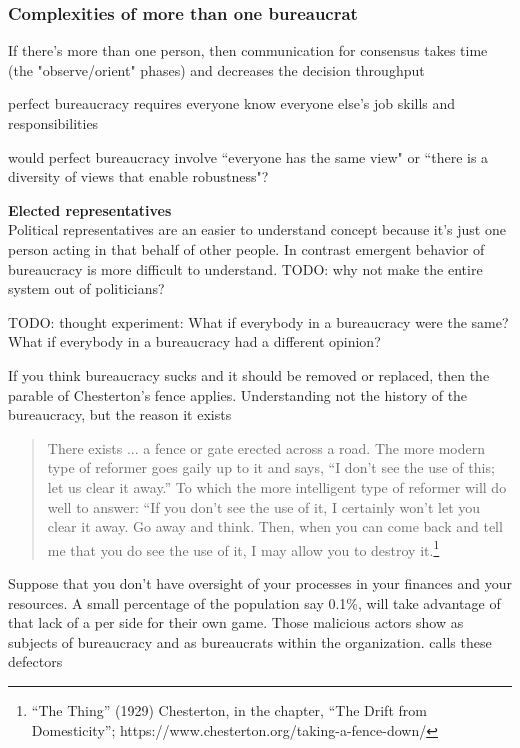 \subsubsection{Complexities of more than one bureaucrat}


If there's more than one person, then communication for consensus takes time (the "observe/orient" phases) and decreases the decision throughput

perfect bureaucracy requires everyone know everyone else's job skills and responsibilities

would perfect bureaucracy involve ``everyone has the same view" or ``there is a diversity of views that enable robustness"?



\textbf{Elected representatives}\\
Political representatives are an easier to understand concept because it's just one person acting in that behalf of other people.
In contrast emergent behavior of bureaucracy is more difficult to understand. 
TODO: why not make the entire system out of politicians?


TODO: thought experiment: 
What if everybody in a bureaucracy were the same?
What if everybody in a bureaucracy had a different opinion?


If you think bureaucracy sucks and it should be removed or replaced, then the parable of Chesterton's fence applies. Understanding not the history of the bureaucracy, but the reason it exists

\begin{quote}
There exists ... a fence or gate erected across a road. The more modern type of reformer goes gaily up to it and says, “I don’t see the use of this; let us clear it away.” To which the more intelligent type of reformer will do well to answer: “If you don’t see the use of it, I certainly won’t let you clear it away. Go away and think. Then, when you can come back and tell me that you do see the use of it, I may allow you to destroy it.\footnote{``The Thing'' (1929) Chesterton, in the chapter, “The Drift from Domesticity”; https://www.chesterton.org/taking-a-fence-down/}
\end{quote}

Suppose that you don't have oversight of your processes in your finances and your resources. A small percentage of the population say 0.1\%, will take advantage of that lack of a per side for their own game. Those malicious actors show as subjects of bureaucracy and as bureaucrats within the organization. 
\cite{2012_Schneier} calls these defectors




